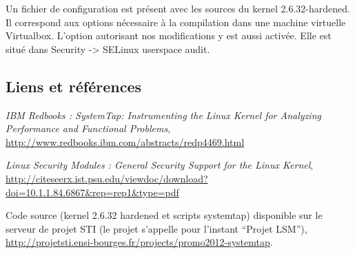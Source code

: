 \documentclass[pdftex,a4paper,titlepage,11pt,openright]{article}
\begin{document}
Un fichier de configuration est présent avec les sources du kernel 2.6.32-hardened. Il correspond aux options nécessaire à la compilation dans une machine virtuelle Virtualbox. L'option autorisant nos modifications y est aussi activée. Elle est situé dans Security -> SELinux userspace audit.

\subsection*{Liens et références}
\begin{thebibliography}{40}
 \textit{IBM Redbooks : SystemTap: Instrumenting the Linux Kernel for Analyzing Performance and Functional Problems}, \url{http://www.redbooks.ibm.com/abstracts/redp4469.html}

 \textit{Linux Security Modules : General Security Support for the Linux Kernel}, \url{http://citeseerx.ist.psu.edu/viewdoc/download?doi=10.1.1.84.6867&rep=rep1&type=pdf}

 Code source (kernel 2.6.32 hardened et scripts systemtap) disponible sur le serveur de projet STI (le projet s'appelle pour l'instant ``Projet LSM''), \url{http://projetsti.ensi-bourges.fr/projects/promo2012-systemtap}.
\end{thebibliography}

\end{document}
